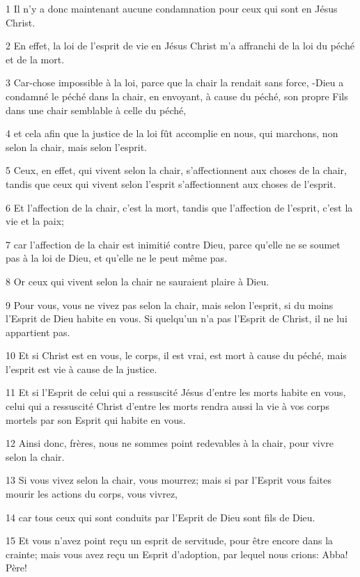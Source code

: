 \par 1 Il n'y a donc maintenant aucune condamnation pour ceux qui sont en Jésus Christ.
\par 2 En effet, la loi de l'esprit de vie en Jésus Christ m'a affranchi de la loi du péché et de la mort.
\par 3 Car-chose impossible à la loi, parce que la chair la rendait sans force, -Dieu a condamné le péché dans la chair, en envoyant, à cause du péché, son propre Fils dans une chair semblable à celle du péché,
\par 4 et cela afin que la justice de la loi fût accomplie en nous, qui marchons, non selon la chair, mais selon l'esprit.
\par 5 Ceux, en effet, qui vivent selon la chair, s'affectionnent aux choses de la chair, tandis que ceux qui vivent selon l'esprit s'affectionnent aux choses de l'esprit.
\par 6 Et l'affection de la chair, c'est la mort, tandis que l'affection de l'esprit, c'est la vie et la paix;
\par 7 car l'affection de la chair est inimitié contre Dieu, parce qu'elle ne se soumet pas à la loi de Dieu, et qu'elle ne le peut même pas.
\par 8 Or ceux qui vivent selon la chair ne sauraient plaire à Dieu.
\par 9 Pour vous, vous ne vivez pas selon la chair, mais selon l'esprit, si du moins l'Esprit de Dieu habite en vous. Si quelqu'un n'a pas l'Esprit de Christ, il ne lui appartient pas.
\par 10 Et si Christ est en vous, le corps, il est vrai, est mort à cause du péché, mais l'esprit est vie à cause de la justice.
\par 11 Et si l'Esprit de celui qui a ressuscité Jésus d'entre les morts habite en vous, celui qui a ressuscité Christ d'entre les morts rendra aussi la vie à vos corps mortels par son Esprit qui habite en vous.
\par 12 Ainsi donc, frères, nous ne sommes point redevables à la chair, pour vivre selon la chair.
\par 13 Si vous vivez selon la chair, vous mourrez; mais si par l'Esprit vous faites mourir les actions du corps, vous vivrez,
\par 14 car tous ceux qui sont conduits par l'Esprit de Dieu sont fils de Dieu.
\par 15 Et vous n'avez point reçu un esprit de servitude, pour être encore dans la crainte; mais vous avez reçu un Esprit d'adoption, par lequel nous crions: Abba! Père!
